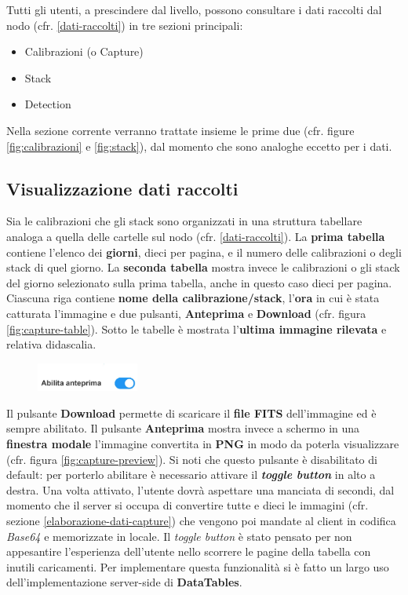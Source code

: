 Tutti gli utenti, a prescindere dal livello, possono consultare i dati raccolti dal nodo (cfr. \ref{dati-raccolti}) in tre sezioni principali:
\begin{itemize}[noitemsep,nolistsep]
    \item Calibrazioni (o Capture)
    \item Stack
    \item Detection
\end{itemize}

Nella sezione corrente verranno trattate insieme le prime due (cfr. figure \ref{fig:calibrazioni} e \ref{fig:stack}), dal momento che sono analoghe eccetto per i dati.

\subsection{Visualizzazione dati raccolti} \label{capture-struct}

Sia le calibrazioni che gli stack sono organizzati in una struttura tabellare analoga a quella delle cartelle sul nodo (cfr. \ref{dati-raccolti}). La \textbf{prima tabella} contiene l'elenco dei \textbf{giorni}, dieci per pagina, e il numero delle calibrazioni o degli stack di quel giorno. La \textbf{seconda tabella} mostra invece le calibrazioni o gli stack del giorno selezionato sulla prima tabella, anche in questo caso dieci per pagina. Ciascuna riga contiene \textbf{nome della calibrazione/stack}, l'\textbf{ora} in cui è stata catturata l'immagine e due pulsanti, \textbf{Anteprima} e \textbf{Download} (cfr. figura \ref{fig:capture-table}). Sotto le tabelle è mostrata l'\textbf{ultima immagine rilevata} e relativa didascalia.

\begin{figure}
    \vspace{-30pt}
    \includegraphics[width=0.3\textwidth]{images/toggle-button.jpg}
    \vspace{-30pt}
\end{figure}
Il pulsante \textbf{Download} permette di scaricare il \textbf{file FITS} dell'immagine ed è sempre abilitato.
Il pulsante \textbf{Anteprima} mostra invece a schermo in una \textbf{finestra modale} l'immagine convertita in \textbf{PNG} in modo da poterla visualizzare (cfr. figura \ref{fig:capture-preview}). Si noti che questo pulsante è disabilitato di default: per porterlo abilitare è necessario attivare il \textbf{\emph{toggle button}} in alto a destra. Una volta attivato, l'utente dovrà aspettare una manciata di secondi, dal momento che il server si occupa di convertire tutte e dieci le immagini (cfr. sezione \ref{elaborazione-dati-capture}) che vengono poi mandate al client in codifica \emph{Base64} e memorizzate in locale. Il \emph{toggle button} è stato pensato per non appesantire l'esperienza dell'utente nello scorrere le pagine della tabella con inutili caricamenti.
Per implementare questa funzionalità si è fatto un largo uso dell'implementazione server-side di \textbf{DataTables}.

